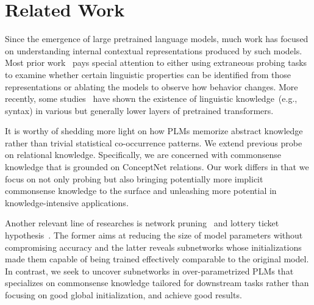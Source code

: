 \section{Related Work}
Since the emergence of large pretrained language models, 
much work has focused on understanding internal contextual representations 
produced by such models. Most prior work~\citep{shi-etal-2016-string,belinkov-etal-2017-neural} pays special attention to either using extraneous 
probing tasks to examine whether certain linguistic properties 
can be identified from those representations or ablating the models 
to observe how behavior changes. More recently, some studies~\citep{DBLP:journals/corr/abs-1901-05287,DBLP:journals/corr/abs-1905-06316} have shown the existence 
of linguistic knowledge~(e.g., syntax) in various but 
generally lower layers of pretrained transformers.

It is worthy of shedding more light on how PLMs 
memorize abstract knowledge rather than trivial statistical co-occurrence 
patterns.  We extend previous probe~\citep{Petroni2020} on relational 
knowledge. Specifically, we are concerned with commonsense knowledge 
that is grounded on ConceptNet relations. Our work differs in that 
we focus on not only probing but also bringing potentially more 
implicit commonsense knowledge to the surface and unleashing more 
potential in knowledge-intensive applications.

Another relevant line of researches is network 
pruning~\citep{liu2018rethinking,Lin2020Dynamic} and lottery ticket 
hypothesis~\citep{conf/iclr/FrankleC19,Prasanna2020,Chen2020}. 
The former aims at reducing the size of model parameters without 
compromising accuracy and the latter reveals subnetworks whose 
initializations made them capable of being trained effectively comparable 
to the original model. In contrast, we seek to uncover subnetworks in 
over-parametrized PLMs that specializes on commonsense knowledge 
tailored for downstream tasks rather than focusing on good global
initialization, and achieve good results. 
